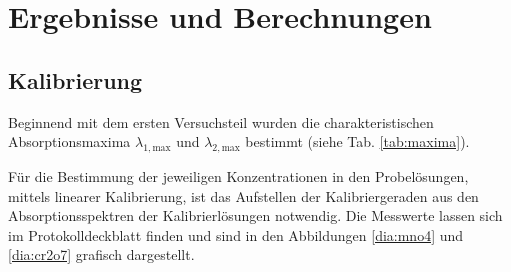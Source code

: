 \newpage
\section{Ergebnisse und Berechnungen}
\label{sec:ergebnisse}

\subsection{Kalibrierung}
Beginnend mit dem ersten Versuchsteil wurden die charakteristischen Absorptionsmaxima $\lambda_{1,\text{max}}$ und $\lambda_{2,\text{max}}$ bestimmt (siehe Tab. \ref{tab:maxima}).

\begin{table}[h!]
	\renewcommand*{\arraystretch}{1.2}
	\centering
	\caption{Absorptionsmaxima  vom Permanganat-Ion $\lambda_{1,\text{max}}$ und vom Dichromat-Ion $\lambda_{2,\text{max}}$ }
	\label{tab:maxima}
\end{table}%
\FloatBarrier

Für die Bestimmung der jeweiligen Konzentrationen in den Probelösungen, mittels linearer Kalibrierung, ist das Aufstellen der Kalibriergeraden aus den Absorptionsspektren der Kalibrierlösungen notwendig. Die Messwerte lassen sich im Protokolldeckblatt finden und sind in den Abbildungen \ref{dia:mno4} und \ref{dia:cr2o7} grafisch dargestellt.


